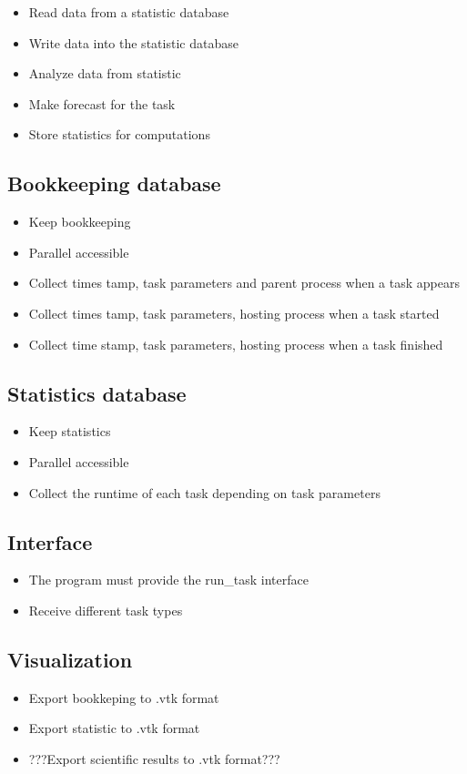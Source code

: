 {		\begin{itemize}
			\item Read data from a statistic database
			\item Write data into the statistic database
			\item Analyze data from statistic
			\item Make forecast for the task
			\item Store statistics for computations
		\end{itemize}
	
	
	\subsection{Bookkeeping database}
	
		\begin{itemize}
			\item Keep bookkeeping
			\item Parallel accessible
			\item Collect times tamp, task parameters and parent process when a task appears
			\item Collect times tamp, task parameters, hosting process when a task started
			\item Collect time stamp, task parameters, hosting process when a task finished
		\end{itemize}
	
	
	\subsection{Statistics database}
	
		\begin{itemize}
			\item Keep statistics
			\item Parallel accessible
			\item Collect the runtime of each task depending on task parameters
		\end{itemize}
	
	
	\subsection{Interface}
	
		\begin{itemize}
			\item The program must provide the run\_task interface
			\item Receive different task types
		\end{itemize}
		
		
	\subsection{Visualization}
	
		\begin{itemize}
			\item Export bookkeping to .vtk format
			\item Export statistic to .vtk format
			\item ???Export scientific results to .vtk format???
		\end{itemize}
}